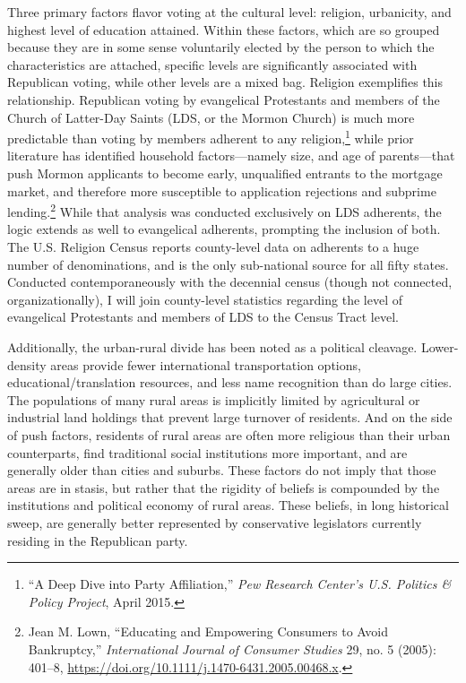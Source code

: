 \documentclass[12pt,oneside]{psthesis}
\begin{document}
Three primary factors flavor voting at the cultural level: religion, urbanicity, and highest level of education attained.
Within these factors, which are so grouped because they are in some sense voluntarily elected by the person to which the characteristics are attached, specific levels are significantly associated with Republican voting, while other levels are a mixed bag.
Religion exemplifies this relationship.
Republican voting by evangelical Protestants and members of the Church of Latter-Day Saints (LDS, or the Mormon Church) is much more predictable than voting by members adherent to any religion,\footnote{``A Deep Dive into Party Affiliation,'' \emph{Pew Research Center's U.S. Politics \& Policy Project}, April 2015.} while prior literature has identified household factors---namely size, and age of parents---that push Mormon applicants to become early, unqualified entrants to the mortgage market, and therefore more susceptible to application rejections and subprime lending.\footnote{Jean M. Lown, ``Educating and Empowering Consumers to Avoid Bankruptcy,'' \emph{International Journal of Consumer Studies} 29, no. 5 (2005): 401--8, \url{https://doi.org/10.1111/j.1470-6431.2005.00468.x}.}
While that analysis was conducted exclusively on LDS adherents, the logic extends as well to evangelical adherents, prompting the inclusion of both.
The U.S. Religion Census reports county-level data on adherents to a huge number of denominations, and is the only sub-national source for all fifty states.
Conducted contemporaneously with the decennial census (though not connected, organizationally), I will join county-level statistics regarding the level of evangelical Protestants and members of LDS to the Census Tract level.

Additionally, the urban-rural divide has been noted as a political cleavage.
Lower-density areas provide fewer international transportation options, educational/translation resources, and less name recognition than do large cities.
The populations of many rural areas is implicitly limited by agricultural or industrial land holdings that prevent large turnover of residents.
And on the side of push factors, residents of rural areas are often more religious than their urban counterparts, find traditional social institutions more important, and are generally older than cities and suburbs.
These factors do not imply that those areas are in stasis, but rather that the rigidity of beliefs is compounded by the institutions and political economy of rural areas.
These beliefs, in long historical sweep, are generally better represented by conservative legislators currently residing in the Republican party.
\end{document}

